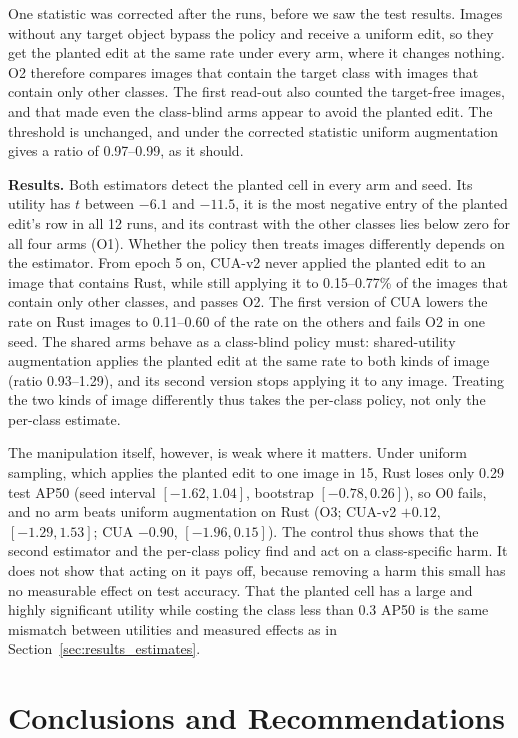 \documentclass[conference]{IEEEtran}
\begin{document}
One statistic was corrected after the runs, before we saw the test results. Images without any target object bypass the policy and receive a uniform edit, so they get the planted edit at the same rate under every arm, where it changes nothing. O2 therefore compares images that contain the target class with images that contain only other classes. The first read-out also counted the target-free images, and that made even the class-blind arms appear to avoid the planted edit. The threshold is unchanged, and under the corrected statistic uniform augmentation gives a ratio of 0.97--0.99, as it should.

\noindent\textbf{Results.} Both estimators detect the planted cell in every arm and seed. Its utility has $t$ between $-6.1$ and $-11.5$, it is the most negative entry of the planted edit's row in all 12 runs, and its contrast with the other classes lies below zero for all four arms (O1). Whether the policy then treats images differently depends on the estimator. From epoch 5 on, CUA-v2 never applied the planted edit to an image that contains Rust, while still applying it to 0.15--0.77\% of the images that contain only other classes, and passes O2. The first version of CUA lowers the rate on Rust images to 0.11--0.60 of the rate on the others and fails O2 in one seed. The shared arms behave as a class-blind policy must: shared-utility augmentation applies the planted edit at the same rate to both kinds of image (ratio 0.93--1.29), and its second version stops applying it to any image. Treating the two kinds of image differently thus takes the per-class policy, not only the per-class estimate.

The manipulation itself, however, is weak where it matters. Under uniform sampling, which applies the planted edit to one image in 15, Rust loses only 0.29 test AP50 (seed interval $[-1.62, 1.04]$, bootstrap $[-0.78, 0.26]$), so O0 fails, and no arm beats uniform augmentation on Rust (O3; CUA-v2 $+0.12$, $[-1.29, 1.53]$; CUA $-0.90$, $[-1.96, 0.15]$). The control thus shows that the second estimator and the per-class policy find and act on a class-specific harm. It does not show that acting on it pays off, because removing a harm this small has no measurable effect on test accuracy. That the planted cell has a large and highly significant utility while costing the class less than 0.3 AP50 is the same mismatch between utilities and measured effects as in Section~\ref{sec:results_estimates}.

\section{Conclusions and Recommendations}
\label{sec:discussion}
\end{document}
